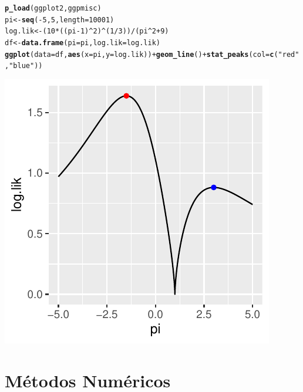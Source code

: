 \documentclass[onesided]{article}\usepackage[]{graphicx}\usepackage[]{color}
\makeatletter
\def\maxwidth{ %
  \ifdim\Gin@nat@width>\linewidth
    \linewidth
  \else
    \Gin@nat@width
  \fi
}
\newcommand{\hlnum}[1]{\textcolor[rgb]{0.686,0.059,0.569}{#1}}%
\newcommand{\hlstr}[1]{\textcolor[rgb]{0.192,0.494,0.8}{#1}}%
\newcommand{\hlopt}[1]{\textcolor[rgb]{0,0,0}{#1}}%
\newcommand{\hlstd}[1]{\textcolor[rgb]{0.345,0.345,0.345}{#1}}%
\newcommand{\hlkwb}[1]{\textcolor[rgb]{0.69,0.353,0.396}{#1}}%
\newcommand{\hlkwc}[1]{\textcolor[rgb]{0.333,0.667,0.333}{#1}}%
\newcommand{\hlkwd}[1]{\textcolor[rgb]{0.737,0.353,0.396}{\textbf{#1}}}%
\newenvironment{kframe}{%
 \def\at@end@of@kframe{}%
 \ifinner\ifhmode%
  \def\at@end@of@kframe{\end{minipage}}%
  \begin{minipage}{\columnwidth}%
 \fi\fi%
 \def\FrameCommand##1{\hskip\@totalleftmargin \hskip-\fboxsep
 \colorbox{shadecolor}{##1}\hskip-\fboxsep
     \hskip-\linewidth \hskip-\@totalleftmargin \hskip\columnwidth}%
 \MakeFramed {\advance\hsize-\width
   \@totalleftmargin\z@ \linewidth\hsize
   \@setminipage}}%
 {\par\unskip\endMakeFramed%
 \at@end@of@kframe}
\newenvironment{knitrout}{}{} %
\makeatother
\begin{document}
\begin{knitrout}
\color{fgcolor}\begin{kframe}
\begin{alltt}
\hlkwd{p_load}\hlstd{(ggplot2,ggpmisc)}
\hlstd{pi} \hlkwb{<-} \hlkwd{seq}\hlstd{(}\hlopt{-}\hlnum{5}\hlstd{,}\hlnum{5}\hlstd{,}\hlkwc{length}\hlstd{=}\hlnum{10001}\hlstd{)}
\hlstd{log.lik} \hlkwb{<-} \hlstd{(}\hlnum{10}\hlopt{*}\hlstd{((pi}\hlopt{-}\hlnum{1}\hlstd{)}\hlopt{^}\hlnum{2}\hlstd{)}\hlopt{^}\hlstd{(}\hlnum{1}\hlopt{/}\hlnum{3}\hlstd{))}\hlopt{/}\hlstd{(pi}\hlopt{^}\hlnum{2} \hlopt{+} \hlnum{9}\hlstd{)}
\hlstd{df} \hlkwb{<-} \hlkwd{data.frame}\hlstd{(}\hlkwc{pi} \hlstd{= pi,} \hlkwc{log.lik} \hlstd{= log.lik)}
\hlkwd{ggplot}\hlstd{(}\hlkwc{data} \hlstd{= df,} \hlkwd{aes}\hlstd{(}\hlkwc{x} \hlstd{= pi,} \hlkwc{y} \hlstd{= log.lik))} \hlopt{+} \hlkwd{geom_line}\hlstd{()} \hlopt{+} \hlkwd{stat_peaks}\hlstd{(}\hlkwc{col} \hlstd{=} \hlkwd{c}\hlstd{(}\hlstr{"red"}\hlstd{,}\hlstr{"blue"}\hlstd{))}
\end{alltt}
\end{kframe}

{\centering \includegraphics[width=\maxwidth]{figure/local_global_max-1} 

}



\end{knitrout}

\section{M\'etodos Num\'ericos}
\end{document}
